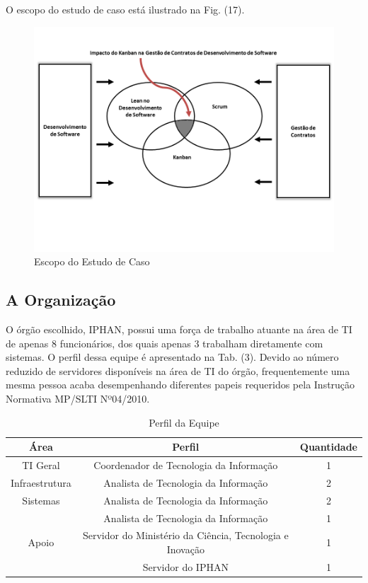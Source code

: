 O escopo do estudo de caso está ilustrado na Fig. (17). 
\begin{figure}[H]
		\centering
		\label{fig01}
			\includegraphics[scale=0.6]{figuras/escopoEC.png}
		\caption{Escopo do Estudo de Caso}
\end{figure}

\subsection[A Organização]{A Organização}

O órgão escolhido, IPHAN, possui uma força de trabalho atuante na área de TI de apenas 8 funcionários, dos quais apenas 3 trabalham diretamente com sistemas. O perfil dessa equipe é apresentado na Tab. (3). Devido ao número reduzido de servidores disponíveis na área de TI do órgão, frequentemente uma mesma pessoa acaba desempenhando diferentes papeis requeridos pela Instrução Normativa MP/SLTI Nº04/2010.

\begin{table}[H]
\center
\footnotesize
\begin{tabular}{|c|c|c|}
\hline
\textbf{Área}          & \textbf{Perfil}   & \textbf{Quantidade} \\ \hline
TI Geral               & Coordenador de Tecnologia da Informação   & 1                   \\ \hline
Infraestrutura         & Analista de Tecnologia da Informação   & 2                   \\ \hline
Sistemas               & Analista de Tecnologia da Informação   & 2                   \\ \hline
\multirow{3}{*}{Apoio} & Analista de Tecnologia da Informação    & 1                   \\ \cline{2-3} 
\multicolumn{1}{|l|}{} & Servidor do Ministério da Ciência, Tecnologia e Inovação & 1                   \\ \cline{2-3} 
\multicolumn{1}{|l|}{} & Servidor do IPHAN & 1                   \\ \hline
\end{tabular}
\caption{Perfil da Equipe}
\end{table}

